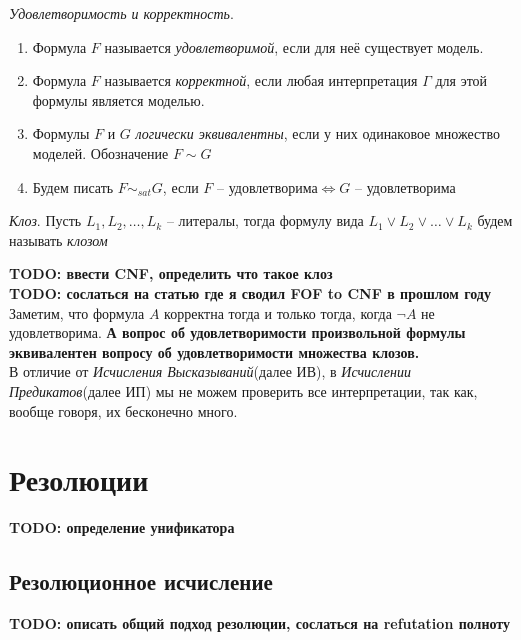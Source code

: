 \begin{definition}
  \emph{Удовлетворимость и корректность}. 
  \begin{enumerate}
  	\item Формула $F$ называется \textit{удовлетворимой}, если для неё существует модель.
  	\item Формула $F$ называется \textit{корректной}, если любая интерпретация $\Gamma$ для этой формулы является моделью.
  	\item Формулы $F$ и $G$ \textit{логически эквивалентны}, если у них одинаковое множество моделей. Обозначение $F \sim G$
  	\item Будем писать $F \sim_{sat} G$, если $F \text{ -- удовлетворима} \iff G \text{ -- удовлетворима}$
  \end{enumerate}
\end{definition}

\begin{definition}
  \emph{Клоз}. Пусть $L_1, L_2, \ldots, L_k$ -- литералы, тогда формулу вида $L_1 \vee L_2 \vee \dots \vee L_k$ будем называть \textit{клозом}
\end{definition}


\textbf{TODO: ввести CNF, определить что такое клоз} \\
\textbf{TODO: сослаться на статью где я сводил FOF to CNF в прошлом году} \\

Заметим, что формула $A$ корректна тогда и только тогда, когда $\neg A$ не удовлетворима. \textbf{А вопрос об удовлетворимости произвольной формулы эквивалентен вопросу об удовлетворимости множества клозов.} \\

В отличие от \textit{Исчисления Высказываний}(далее ИВ), в \textit{Исчислении Предикатов}(далее ИП) мы не можем проверить все интерпретации, так как, вообще говоря, их бесконечно много.\\

\section{Резолюции}

\textbf{TODO: определение унификатора} 

\subsection{Резолюционное исчисление}
\textbf{TODO: описать общий подход резолюции, сослаться на refutation полноту}

